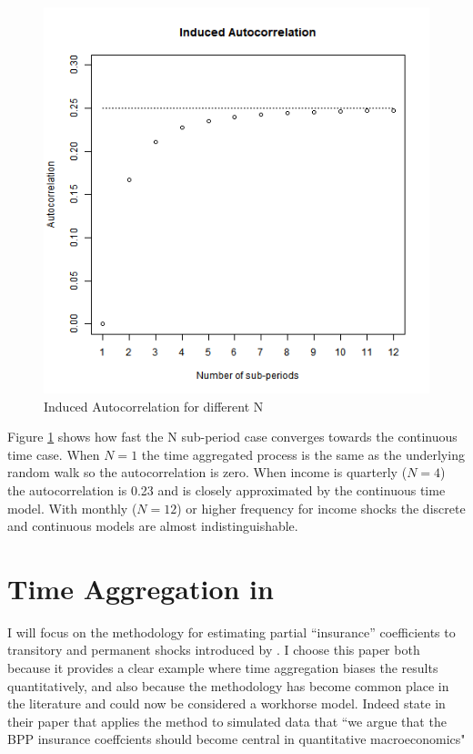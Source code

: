 \documentclass[titlepage]{\econtex}\newcommand{\texname}{BPP_TimeAgg}
\begin{document}
\begin{figure}
	\caption{Induced Autocorrelation for different N}
	\label{fig:InducedAutocorrelation}
	\includegraphics[width=1\textwidth]{../Code/Figures/InducedAutocorrelation.png}
\end{figure}
Figure \ref{fig:InducedAutocorrelation} shows how fast the N sub-period case converges towards the continuous time case. When $N=1$ the time aggregated process is the same as the underlying random walk so the autocorrelation is zero. When income is quarterly ($N=4$) the autocorrelation is 0.23 and is closely approximated by the continuous time model. With monthly ($N=12$) or higher frequency for income shocks the discrete and continuous models are almost indistinguishable. 

\section{Time Aggregation in \cite{blundell_consumption_2008}} \label{BPP}
I will focus on the methodology for estimating partial ``insurance'' coefficients to transitory and permanent shocks introduced by \cite{blundell_consumption_2008}. I choose this paper both because it provides a clear example where time aggregation biases the results quantitatively, and also because the methodology has become common place in the literature and could now be considered a workhorse model. Indeed \cite{kaplan_how_2010} state in their paper that applies the method to simulated data that ``we argue that the BPP insurance coeffcients should become central in quantitative
macroeconomics"
\end{document}
